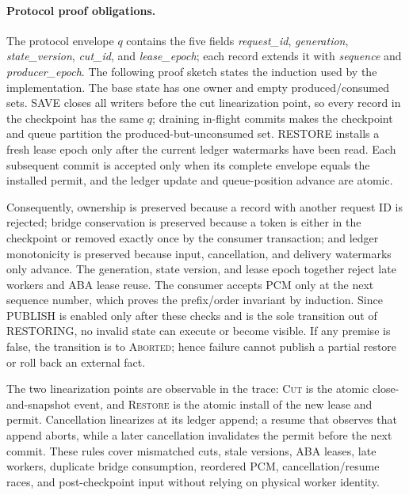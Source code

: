\paragraph{Protocol proof obligations.}
The protocol envelope $q$ contains the five fields
\textit{request\_id}, \textit{generation}, \textit{state\_version},
\textit{cut\_id}, and \textit{lease\_epoch}; each record extends it with
\textit{sequence} and \textit{producer\_epoch}.  The following proof sketch
states the induction used by the implementation.  The base state has one
owner and empty produced/consumed sets.  SAVE closes all writers before the
cut linearization point, so every record in the checkpoint has the same $q$;
draining in-flight commits makes the checkpoint and queue partition the
produced-but-unconsumed set.  RESTORE installs a fresh lease epoch only after
the current ledger watermarks have been read.  Each subsequent commit is
accepted only when its complete envelope equals the installed permit, and
the ledger update and queue-position advance are atomic.

Consequently, ownership is preserved because a record with another request ID
is rejected; bridge conservation is preserved because a token is either in
the checkpoint or removed exactly once by the consumer transaction; and ledger
monotonicity is preserved because input, cancellation, and delivery watermarks
only advance.  The generation, state version, and lease epoch together reject
late workers and ABA lease reuse.  The consumer accepts PCM only at the next
sequence number, which proves the prefix/order invariant by induction.  Since
PUBLISH is enabled only after these checks and is the sole transition out of
RESTORING, no invalid state can execute or become visible.  If any premise is
false, the transition is to \textsc{Aborted}; hence failure cannot publish a
partial restore or roll back an external fact.

The two linearization points are observable in the trace: \textsc{Cut} is the
atomic close-and-snapshot event, and \textsc{Restore} is the atomic install of
the new lease and permit.  Cancellation linearizes at its ledger append; a
resume that observes that append aborts, while a later cancellation invalidates
the permit before the next commit.  These rules cover mismatched cuts, stale
versions, ABA leases, late workers, duplicate bridge consumption, reordered
PCM, cancellation/resume races, and post-checkpoint input without relying on
physical worker identity.

